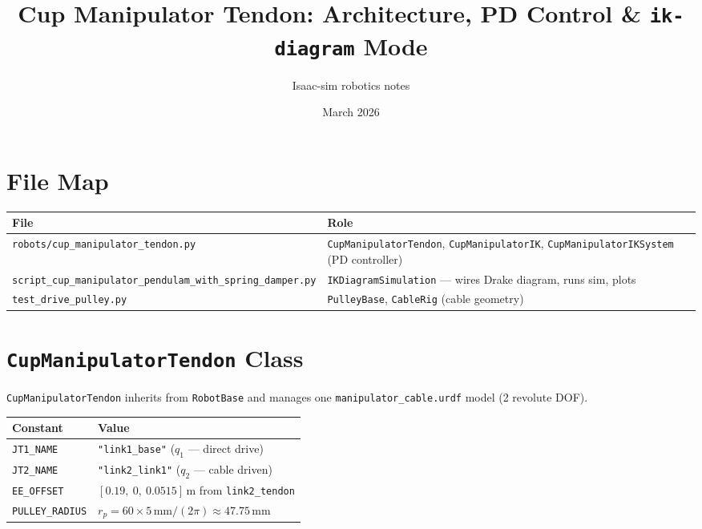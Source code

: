 \documentclass[11pt, a4paper]{article}
\title{\textbf{Cup Manipulator Tendon: Architecture, PD Control \& \texttt{ik-diagram} Mode}}
\date{March 2026}
\author{Isaac-sim robotics notes}
\begin{document}
\maketitle

\section{File Map}

\begin{center}
\begin{tabular}{ll}
\toprule
\textbf{File} & \textbf{Role} \\
\midrule
\texttt{robots/cup\_manipulator\_tendon.py} & \texttt{CupManipulatorTendon}, \texttt{CupManipulatorIK},
                                               \texttt{CupManipulatorIKSystem} (PD controller) \\
\texttt{script\_cup\_manipulator\_pendulam\_with\_spring\_damper.py}
                                            & \texttt{IKDiagramSimulation} — wires Drake diagram,
                                              runs sim, plots \\
\texttt{test\_drive\_pulley.py}             & \texttt{PulleyBase}, \texttt{CableRig} (cable geometry) \\
\bottomrule
\end{tabular}
\end{center}

\section{\texttt{CupManipulatorTendon} Class}

\texttt{CupManipulatorTendon} inherits from \texttt{RobotBase} and manages
one \texttt{manipulator\_cable.urdf} model (2 revolute DOF).

\begin{center}
\begin{tabular}{ll}
\toprule
\textbf{Constant} & \textbf{Value} \\
\midrule
\texttt{JT1\_NAME}      & \texttt{"link1\_base"} ($q_1$ — direct drive) \\
\texttt{JT2\_NAME}      & \texttt{"link2\_link1"} ($q_2$ — cable driven) \\
\texttt{EE\_OFFSET}     & $[0.19,\ 0,\ 0.0515]$\,m from \texttt{link2\_tendon} \\
\texttt{PULLEY\_RADIUS} & $r_p = 60\times5\,\text{mm}/(2\pi) \approx 47.75\,\text{mm}$ \\
\bottomrule
\end{tabular}
\end{center}
\end{document}
